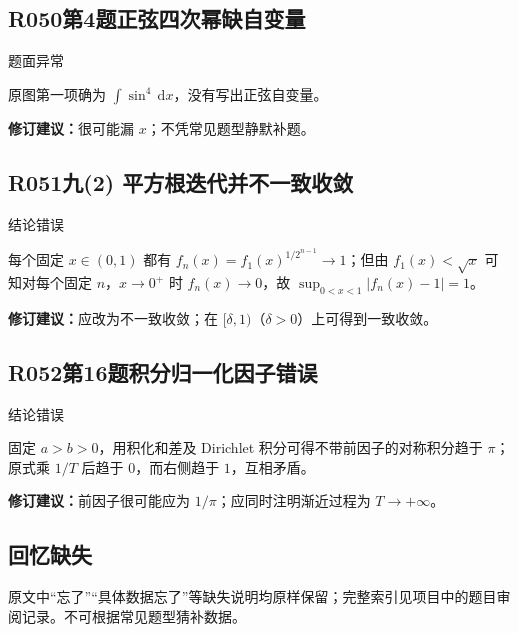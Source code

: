 \subsection*{R050\quad 第4题正弦四次幂缺自变量}
\noindent{}\quad 题面异常\par
原图第一项确为 $\int\sin^4\,\mathrm dx$，没有写出正弦自变量。
\par\textbf{修订建议：}很可能漏 $x$；不凭常见题型静默补题。\par
{}
\subsection*{R051\quad 九(2) 平方根迭代并不一致收敛}
\noindent{}\quad 结论错误\par
每个固定 $x\in(0,1)$ 都有 $f_n(x)=f_1(x)^{1/2^{n-1}}\to1$；但由 $f_1(x)<\sqrt{x}$ 可知对每个固定 $n$，$x\to0^+$ 时 $f_n(x)\to0$，故 $\sup_{0<x<1}|f_n(x)-1|=1$。
\par\textbf{修订建议：}应改为不一致收敛；在 $[\delta,1)$（$\delta>0$）上可得到一致收敛。\par
{}
\subsection*{R052\quad 第16题积分归一化因子错误}
\noindent{}\quad 结论错误\par
固定 $a>b>0$，用积化和差及 Dirichlet 积分可得不带前因子的对称积分趋于 $\pi$；原式乘 $1/T$ 后趋于 $0$，而右侧趋于 $1$，互相矛盾。
\par\textbf{修订建议：}前因子很可能应为 $1/\pi$；应同时注明渐近过程为 $T\to+\infty$。\par
\subsection*{回忆缺失}
原文中“忘了”“具体数据忘了”等缺失说明均原样保留；完整索引见项目中的题目审阅记录。不可根据常见题型猜补数据。
